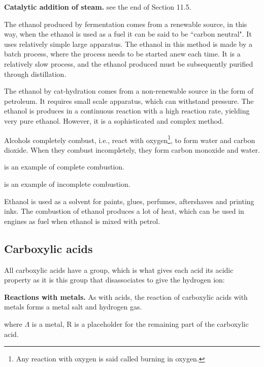 \textbf{Catalytic addition of steam.} see the end of Section 11.5.

The ethanol produced by fermentation comes from a renewable source, in this way, when the ethanol
is used as a fuel it can be said to be ``carbon neutral". It uses relatively simple large 
apparatus. The ethanol in this method is made by a batch process, where the process needs to be
started anew each time. It is a relatively slow process, and the ethanol produced must be
subsequently purified through distillation.

The ethanol by cat-hydration comes from a non-renewable source in the form of petroleum. It requires
small scale apparatus, which can withstand pressure. The ethanol is produces in a continuous
reaction with a high reaction rate, yielding very pure ethanol. However, it is a sophisticated and
complex method.

Alcohols completely combust, i.e., react with oxygen\footnote{Any reaction with oxygen is said 
called burning in oxygen.}, to form water and carbon dioxide. When they combust incompletely, they
form carbon monoxide and water.

\begin{center}
\end{center}
is an example of complete combustion.
\begin{center}
\end{center}
is an example of incomplete combustion.

Ethanol is used as a solvent for paints, glues, perfumes, aftershaves and printing inks. The
combustion of ethanol produces a lot of heat, which can be used in engines as fuel when ethanol
is mixed with petrol.

\subsection{Carboxylic acids}

All carboxylic acids have a  group, which is what gives each acid its acidic 
property as it is this group that disassociates to give the hydrogen ion:
\begin{center}
\end{center}

\textbf{Reactions with metals.} As with acids, the reaction of carboxylic acids with metals forms
a metal salt and hydrogen gas.

\begin{center}
\end{center}
where $\Lambda$ is a metal, R is a placeholder for the remaining part of the carboxylic acid.

